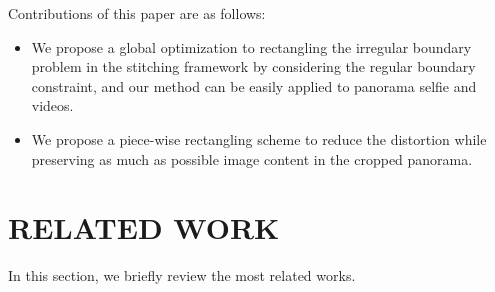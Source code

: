 \documentclass[10pt,journal,compsoc]{IEEEtran}
\begin{document}
Contributions of this paper are as follows:
\begin{itemize}
   \item We propose a global optimization to rectangling the irregular boundary problem in the stitching framework by considering the regular boundary constraint, and our method can be easily applied to panorama selfie and videos.
   \item We propose a piece-wise rectangling scheme to reduce the distortion while preserving as much as possible image content in the cropped panorama.
\end{itemize}

 \section{RELATED WORK}
In this section, we briefly review the most related works.
\end{document}
